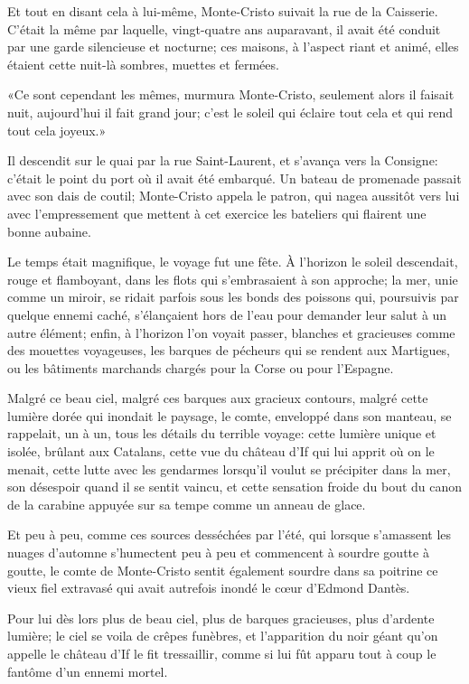 Et tout en disant cela à lui-même, Monte-Cristo suivait la rue de la Caisserie. C'était la même par laquelle, vingt-quatre ans auparavant, il avait été conduit par une garde silencieuse et nocturne; ces maisons, à l'aspect riant et animé, elles étaient cette nuit-là sombres, muettes et fermées. 

«Ce sont cependant les mêmes, murmura Monte-Cristo, seulement alors il faisait nuit, aujourd'hui il fait grand jour; c'est le soleil qui éclaire tout cela et qui rend tout cela joyeux.» 

Il descendit sur le quai par la rue Saint-Laurent, et s'avança vers la Consigne: c'était le point du port où il avait été embarqué. Un bateau de promenade passait avec son dais de coutil; Monte-Cristo appela le patron, qui nagea aussitôt vers lui avec l'empressement que mettent à cet exercice les bateliers qui flairent une bonne aubaine. 

Le temps était magnifique, le voyage fut une fête. À l'horizon le soleil descendait, rouge et flamboyant, dans les flots qui s'embrasaient à son approche; la mer, unie comme un miroir, se ridait parfois sous les bonds des poissons qui, poursuivis par quelque ennemi caché, s'élançaient hors de l'eau pour demander leur salut à un autre élément; enfin, à l'horizon l'on voyait passer, blanches et gracieuses comme des mouettes voyageuses, les barques de pécheurs qui se rendent aux Martigues, ou les bâtiments marchands chargés pour la Corse ou pour l'Espagne. 

Malgré ce beau ciel, malgré ces barques aux gracieux contours, malgré cette lumière dorée qui inondait le paysage, le comte, enveloppé dans son manteau, se rappelait, un à un, tous les détails du terrible voyage: cette lumière unique et isolée, brûlant aux Catalans, cette vue du château d'If qui lui apprit où on le menait, cette lutte avec les gendarmes lorsqu'il voulut se précipiter dans la mer, son désespoir quand il se sentit vaincu, et cette sensation froide du bout du canon de la carabine appuyée sur sa tempe comme un anneau de glace. 

Et peu à peu, comme ces sources desséchées par l'été, qui lorsque s'amassent les nuages d'automne s'humectent peu à peu et commencent à sourdre goutte à goutte, le comte de Monte-Cristo sentit également sourdre dans sa poitrine ce vieux fiel extravasé qui avait autrefois inondé le cœur d'Edmond Dantès. 

Pour lui dès lors plus de beau ciel, plus de barques gracieuses, plus d'ardente lumière; le ciel se voila de crêpes funèbres, et l'apparition du noir géant qu'on appelle le château d'If le fit tressaillir, comme si lui fût apparu tout à coup le fantôme d'un ennemi mortel. 

